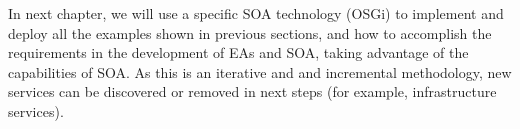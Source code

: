 In next chapter, we will use a specific SOA technology (OSGi) to implement and deploy all the examples shown in previous sections, and how to accomplish the requirements in the development of EAs and SOA, taking advantage of the capabilities of SOA. As this is an iterative and and incremental methodology, new services can be discovered or removed in next steps (for example, infrastructure services).


